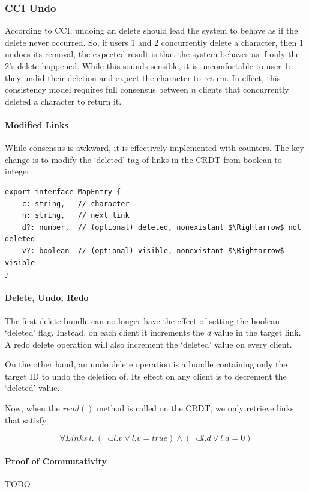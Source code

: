 \documentclass[12pt,a4paper,twoside,openright]{report}
\begin{document}
		\subsubsection{CCI Undo}
		According to CCI, undoing an delete should lead the system to behave as if the delete never occurred. So, if users 1 and 2 concurrently delete a character, then 1 undoes its removal, the expected result is that the system behaves as if only the 2's delete happened. While this sounds sensible, it is uncomfortable to user 1: they undid their deletion and expect the character to return. In effect, this consistency model requires full consensus between $n$ clients that concurrently deleted a character to return it.
		
			\paragraph{Modified Links}
			While consensus is awkward, it is effectively implemented with counters. The key change is to modify the `deleted' tag of links in the CRDT from boolean to integer.
			
\begin{lstlisting}[caption={New Type Signature of a Link in the CRDT}, mathescape=true]
export interface MapEntry {
	c: string,   // character
	n: string,   // next link
	d?: number,  // (optional) deleted, nonexistant $\Rightarrow$ not deleted
	v?: boolean  // (optional) visible, nonexistant $\Rightarrow$ visible
}
\end{lstlisting}

			\paragraph{Delete, Undo, Redo}
			The first delete bundle can no longer have the effect of setting the boolean `deleted' flag. Instead, on each client it increments the $d$ value in the target link. A redo delete operation will also increment the `deleted' value on every client.
			
			On the other hand, an undo delete operation is a bundle containing only the target ID to undo the deletion of. Its effect on any client is to decrement the `deleted' value.
			
			Now, when the $read()$ method is called on the CRDT, we only retrieve links that satisfy
			
				\[\forall Links\ l.\  (\lnot\exists l.v \lor l.v = true) \land (\lnot\exists l.d \lor l.d = 0 ) \] 
			
			\paragraph{Proof of Commutativity}
			TODO
			
\end{document}
